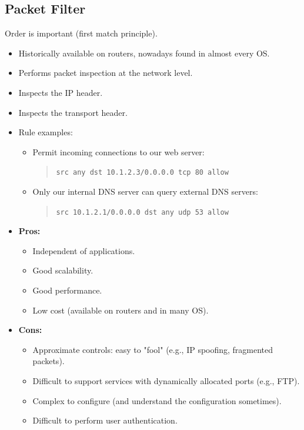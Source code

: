 \subsection{Packet Filter}
\begin{tcolorbox}[colback=red!10!white, colframe=red!70!black, coltitle=white, title=Beware]
    Order is important (first match principle).
\end{tcolorbox}
\begin{itemize}
    \item Historically available on routers, nowadays found in almost every OS.
    \item Performs packet inspection at the network level.
    \item Inspects the IP header.
    \item Inspects the transport header.
    \item Rule examples:
    \begin{itemize}
        \item Permit incoming connections to our web server:
        \begin{quote}
            \texttt{src any dst 10.1.2.3/0.0.0.0 tcp 80 allow}
        \end{quote}
        \item Only our internal DNS server can query external DNS servers:
        \begin{quote}
            \texttt{src 10.1.2.1/0.0.0.0 dst any udp 53 allow}
        \end{quote}
    \end{itemize}
\end{itemize}

\begin{itemize}
    \item \textbf{Pros:}
    \begin{itemize}
        \item Independent of applications.
        \item Good scalability.
        \item Good performance.
        \item Low cost (available on routers and in many OS).
    \end{itemize}
    \item \textbf{Cons:}
    \begin{itemize}
        \item Approximate controls: easy to "fool" (e.g., IP spoofing, fragmented packets).
        \item Difficult to support services with dynamically allocated ports (e.g., FTP).
        \item Complex to configure (and understand the configuration sometimes).
        \item Difficult to perform user authentication.
    \end{itemize}
\end{itemize}

